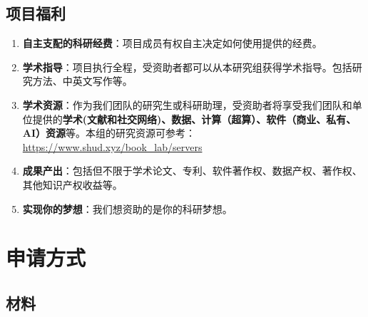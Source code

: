 \documentclass[
]{book}
\providecommand{\tightlist}{%
  \setlength{\itemsep}{0pt}\setlength{\parskip}{0pt}}
\begin{document}
\hypertarget{ux9879ux76eeux798fux5229}{%
\section{项目福利}\label{ux9879ux76eeux798fux5229}}

\begin{enumerate}
\def\labelenumi{\arabic{enumi}.}
\tightlist
\item
  \textbf{自主支配的科研经费}：项目成员有权自主决定如何使用提供的经费。
\item
  \textbf{学术指导}：项目执行全程，受资助者都可以从本研究组获得学术指导。包括研究方法、中英文写作等。
\item
  \textbf{学术资源}：作为我们团队的研究生或科研助理，受资助者将享受我们团队和单位提供的\textbf{学术(文献和社交网络)、数据、计算（超算）、软件（商业、私有、AI）资源}等。本组的研究资源可参考：\url{https://www.shud.xyz/book_lab/servers}
\item
  \textbf{成果产出}：包括但不限于学术论文、专利、软件著作权、数据产权、著作权、其他知识产权收益等。
\item
  \textbf{实现你的梦想}：我们想资助的是你的科研梦想。
\end{enumerate}

\hypertarget{ux7533ux8bf7ux65b9ux5f0f}{%
\chapter{申请方式}\label{ux7533ux8bf7ux65b9ux5f0f}}

\hypertarget{ux6750ux6599}{%
\section{材料}\label{ux6750ux6599}}
\end{document}
